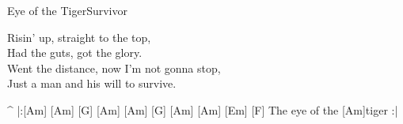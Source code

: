 \begin{song}{Eye of the Tiger}{Survivor}

\begin{guitar}
Risin' up, straight to the top,\\
Had the guts, got the glory.\\
Went the distance, now I'm not gonna stop,\\
Just a man and his will to survive.\\
\end{guitar}



\begin{guitar}
^ |:[Am]     [Am]   [G]  [Am]     [Am]   [G]  [Am]     [Am]   [Em]   [F]  The eye of the [Am]tiger :|\\
\end{guitar}

\end{song}
